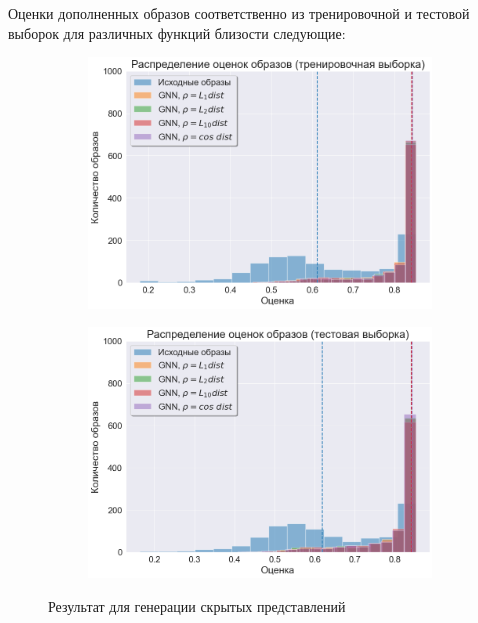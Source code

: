 \documentclass[a4paper,14pt]{extarticle}
\begin{document}
				Оценки дополненных образов соответственно из тренировочной и тестовой выборок для различных функций близости следующие:				
				\begin{figure}[h!]
					\begin{subfigure}[b]{0.5\linewidth}
						\includegraphics[scale = 0.47]{../figures/GNN_at_least_5_subset1000_train.png}
					\end{subfigure}
					\hfill
					\begin{subfigure}[b]{0.5\linewidth}
						\includegraphics[scale = 0.47]{../figures/GNN_at_least_5_subset1000_test.png}
					\end{subfigure}
				\caption{Результат для генерации скрытых представлений}
				\end{figure}
			
\end{document}
